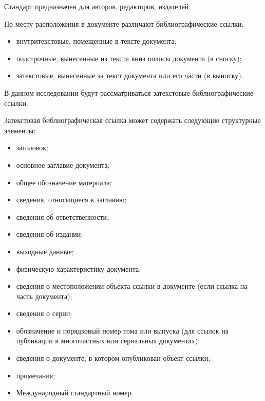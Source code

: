 Стандарт предназначен для авторов, редакторов, издателей.

По месту расположения в документе различают библиографические ссылки:
\begin{itemize}
	\item внутритекстовые, помещенные в тексте документа;
	\item подстрочные, вынесенные из текста вниз полосы документа (в сноску);
	\item затекстовые, вынесенные за текст документа или его части (в выноску).
\end{itemize}

В данном исследовании будут рассматриваться затекстовые библиографические ссылки.

Затекстовая библиографическая ссылка может содержать следующие структурные элементы:
\begin{itemize}
	\item заголовок;
	\item основное заглавие документа;
	\item общее обозначение материала;
	\item сведения, относящиеся к заглавию;
	\item сведения об ответственности;
	\item сведения об издании;
	\item выходные данные;
	\item физическую характеристику документа;
	\item сведения о местоположении объекта ссылки в документе (если ссылка на часть документа);
	\item сведения о серии;
	\item обозначение и порядковый номер тома или выпуска (для ссылок на публикации в многочастных или сериальных документах);
	\item сведения о документе, в котором опубликован объект ссылки;
	\item примечания;
	\item Международный стандартный номер.
\end{itemize}

